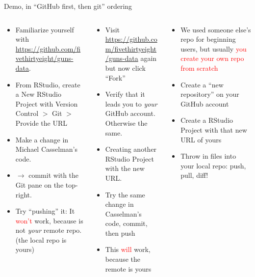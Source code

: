 \documentclass[ignorenonframetext, 10pt, aspectratio=169]{beamer}
\begin{document}
\begin{frame}{Demo, in ``GitHub first, then git'' ordering}
\begin{columns}[T]
\begin{column}{0.33\textwidth}
\footnotesize
\begin{itemize}
\item Familiarize yourself with \url{https://github.com/fivethirtyeight/guns-data}.
\item From RStudio, create a New RStudio Project with Version Control $>$ Git $>$ Provide the URL
\item Make a change in Michael Casselman's code.
\item $\rightarrow$ commit with the Git pane on the top-right.
\item Try ``pushing'' it: It \textcolor{red}{won't} work, because  is not \emph{your} remote repo. (the local repo is yours)
\end{itemize}
\end{column}
\begin{column}{0.33\textwidth}
\footnotesize
\begin{itemize}
  \item Visit \url{https://github.com/fivethirtyeight/guns-data} again but now click ``Fork''
  \item Verify that it leads you to \emph{your} GitHub account. Otherwise the same.
  \item Creating another RStudio Project with the new URL.
  \item Try the same change in Casselman's code, commit, then push
  \item This \textcolor{red}{will} work, because the remote is yours
\end{itemize}
\end{column}
\begin{column}{0.33\textwidth}
\footnotesize
\begin{itemize}
\item We used someone else's repo for beginning users, but usually \textcolor{red}{you create your own repo from scratch}
\item Create a ``new repository'' on your GitHub account
\item Create a RStudio Project with that new URL of yours
\item Throw in files into your local repo: push, pull, diff!
\end{itemize}
\end{column}
\end{columns}
\end{frame}
\end{document}
